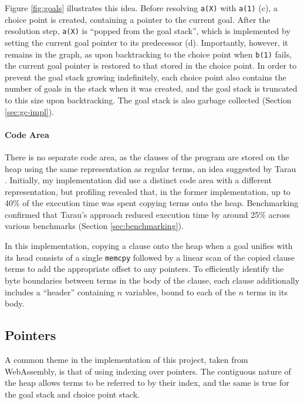 Figure \ref{fig:goals} illustrates this idea. Before resolving \texttt{a(X)} with \texttt{a(1)} (c), a choice point is created, containing a pointer to the current goal. After the resolution step, \texttt{a(X)} is ``popped from the goal stack'', which is implemented by setting the current goal pointer to its predecessor (d). Importantly, however, it remains in the graph, as upon backtracking to the choice point when \texttt{b(1)} fails, the current goal pointer is restored to that stored in the choice point. In order to prevent the goal stack growing indefinitely, each choice point also contains the number of goals in the stack when it was created, and the goal stack is truncated to this size upon backtracking. The goal stack is also garbage collected (Section \ref{sec:gc-impl}).

\paragraph{Code Area} There is no separate code area, as the clauses of the program are stored on the heap using the same representation as regular terms, an idea suggested by Tarau \cite{tarauHitchhikersGuideReinventing2018}. Initially, my implementation did use a distinct code area with a different representation, but profiling revealed that, in the former implementation, up to 40\% of the execution time was spent copying terms onto the heap. Benchmarking confirmed that Tarau's approach reduced execution time by around 25\% across various benchmarks (Section \ref{sec:benchmarking}).

In this implementation, copying a clause onto the heap when a goal unifies with its head consists of a single \texttt{memcpy} followed by a linear scan of the copied clause terms to add the appropriate offset to any pointers. To efficiently identify the byte boundaries between terms in the body of the clause, each clause additionally includes a ``header'' containing $n$ variables, bound to each of the $n$ terms in its body.

\subsection{Pointers}

A common theme in the implementation of this project, taken from WebAssembly, is that of using indexing over pointers. The contiguous nature of the heap allows terms to be referred to by their index, and the same is true for the goal stack and choice point stack.


